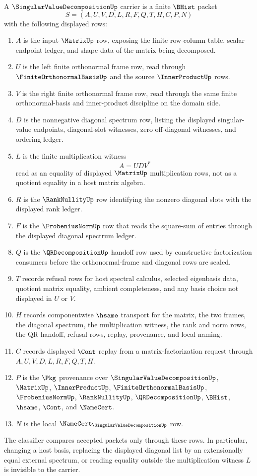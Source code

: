 \begin{definition}
\label{def:singular-value-decomposition-carrier}
A $\SingularValueDecompositionUp$ carrier is a finite $\BHist$ packet
$$
S=(A,U,V,D,L,R,F,Q,T,H,C,P,N)
$$
with the following displayed rows:
\begin{enumerate}
\item $A$ is the input $\MatrixUp$ row, exposing the finite row-column table, scalar endpoint ledger, and shape data of the matrix being decomposed.
\item $U$ is the left finite orthonormal frame row, read through $\FiniteOrthonormalBasisUp$ and the source $\InnerProductUp$ rows.
\item $V$ is the right finite orthonormal frame row, read through the same finite orthonormal-basis and inner-product discipline on the domain side.
\item $D$ is the nonnegative diagonal spectrum row, listing the displayed singular-value endpoints, diagonal-slot witnesses, zero off-diagonal witnesses, and ordering ledger.
\item $L$ is the finite multiplication witness
$$
A = U D V^{\ast}
$$
read as an equality of displayed $\MatrixUp$ multiplication rows, not as a quotient equality in a host matrix algebra.
\item $R$ is the $\RankNullityUp$ row identifying the nonzero diagonal slots with the displayed rank ledger.
\item $F$ is the $\FrobeniusNormUp$ row that reads the square-sum of entries through the displayed diagonal spectrum ledger.
\item $Q$ is the $\QRDecompositionUp$ handoff row used by constructive factorization consumers before the orthonormal-frame and diagonal rows are sealed.
\item $T$ records refusal rows for host spectral calculus, selected eigenbasis data, quotient matrix equality, ambient completeness, and any basis choice not displayed in $U$ or $V$.
\item $H$ records componentwise $\hsame$ transport for the matrix, the two frames, the diagonal spectrum, the multiplication witness, the rank and norm rows, the QR handoff, refusal rows, replay, provenance, and local naming.
\item $C$ records displayed $\Cont$ replay from a matrix-factorization request through $A,U,V,D,L,R,F,Q,T,H$.
\item $P$ is the $\Pkg$ provenance over $\SingularValueDecompositionUp$, $\MatrixUp$, $\InnerProductUp$, $\FiniteOrthonormalBasisUp$, $\FrobeniusNormUp$, $\RankNullityUp$, $\QRDecompositionUp$, $\BHist$, $\hsame$, $\Cont$, and $\NameCert$.
\item $N$ is the local $\NameCert_{\SingularValueDecompositionUp}$ row.
\end{enumerate}
The classifier compares accepted packets only through these rows. In particular, changing a host basis, replacing the displayed diagonal list by an extensionally equal external spectrum, or reading equality outside the multiplication witness $L$ is invisible to the carrier.
\end{definition}
